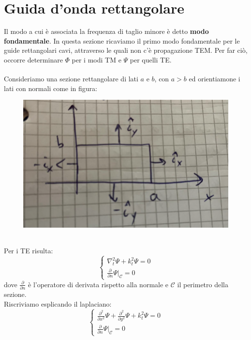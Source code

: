 \documentclass{book}
\begin{document}
\section{Guida d'onda rettangolare}
    Il modo a cui è associata la frequenza di taglio minore è detto \textbf{modo fondamentale}. In questa 
    sezione ricaviamo il primo modo fondamentale per le guide rettangolari cavi, attraverso le quali non c'è propagazione TEM. 
    Per far ciò, occorre determinare $\Phi$ per i modi TM e $\Psi$ per quelli TE. \\ \\
    Consideriamo una sezione rettangolare di lati $a$ e $b$, con $a>b$ ed orientiamone i lati con normali come in figura:
    \begin{figure}[h!]
        \center  
        \includegraphics[width=0.6\linewidth]{img/Chapter_three/Chapt3img2.png}
    \end{figure}
    \\ Per i TE risulta:
    \begin{equation}
        \begin{cases}
            \nabla_{t} ^{2} \Psi + k_{t} ^{2} \Psi = 0 \\
            \frac{\partial}{\partial n} \Psi|_{\mathcal{C}} = 0
        \end{cases}
    \end{equation}
    dove $\displaystyle \frac{\partial}{\partial n}$ è l'operatore di derivata rispetto alla normale e $\mathcal{C}$ il perimetro
    della sezione.\\
    Riscriviamo esplicando il laplaciano:
    \begin{equation}
        \label{eqn:mi_serve6}
        \begin{cases}
            \displaystyle \frac{\partial ^{2}}{\partial x^{2}}\Psi + \frac{\partial ^{2}}{\partial y^{2}}\Psi + k_{t} ^{2} \Psi = 0 \\
            \displaystyle \frac{\partial}{\partial n} \Psi|_{\mathcal{C}} = 0
        \end{cases}
    \end{equation} \\
\end{document}
